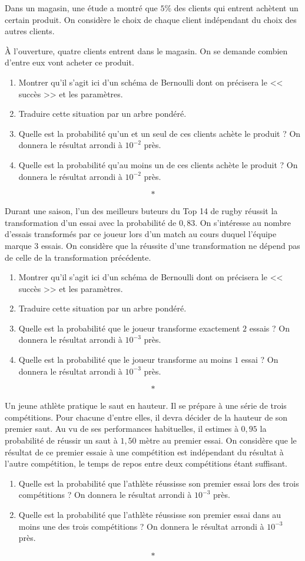 \documentclass[10pt,openright,twoside,french]{book}
\begin{document}

\exo Dans un magasin, une étude a montré que $5\%$ des clients qui entrent achètent un certain produit. On considère le choix de chaque client indépendant du choix des autres clients.\par
À l'ouverture, quatre clients entrent dans le magasin. On se demande combien d'entre eux vont acheter ce produit.
\begin{enumerate}
    \item Montrer qu'il s'agit ici d'un schéma de Bernoulli dont on précisera le << succès >> et les paramètres.
    \item Traduire cette situation par un arbre pondéré.
    \item Quelle est la probabilité qu'un et un seul de ces clients achète le produit ? On donnera le résultat arrondi à $10^{-2}$ près.
    \item Quelle est la probabilité qu'au moins un de ces clients achète le produit ? On donnera le résultat arrondi à $10^{-2}$ près.
\end{enumerate}\[*\]

\exo Durant une saison, l'un des meilleurs buteurs du Top 14 de rugby réussit la transformation d'un essai avec la probabilité de $0,83$. On s'intéresse au nombre d'essais transformés par ce joueur lors d'un match au cours duquel l'équipe marque $3$ essais. On considère que la réussite d'une transformation ne dépend pas de celle de la transformation précédente.
\begin{enumerate}
    \item Montrer qu'il s'agit ici d'un schéma de Bernoulli dont on précisera le << succès >> et les paramètres.
    \item Traduire cette situation par un arbre pondéré.
    \item Quelle est la probabilité que le joueur transforme exactement $2$ essais ? On donnera le résultat arrondi à $10^{-3}$ près.
    \item Quelle est la probabilité que le joueur transforme au moins $1$ essai ? On donnera le résultat arrondi à $10^{-3}$ près.
\end{enumerate}\[*\]

\exo Un jeune athlète pratique le saut en hauteur. Il se prépare à une série de trois compétitions. Pour chacune d'entre elles, il devra décider de la hauteur de son premier saut. Au vu de ses performances habituelles, il estimes à $0,95$ la probabilité de réussir un saut à $1,50$ mètre au premier essai. On considère que le résultat de ce premier essaie à une compétition est indépendant du résultat à l'autre compétition, le temps de repos entre deux compétitions étant suffisant.
\begin{enumerate}
    \item Quelle est la probabilité que l'athlète réussisse son premier essai lors des trois compétitions ? On donnera le résultat arrondi à $10^{-3}$ près.
    \item Quelle est la probabilité que l'athlète réussisse son premier essai dans au moins une des trois compétitions ? On donnera le résultat arrondi à $10^{-3}$ près.
\end{enumerate}\[*\]
\end{document}
